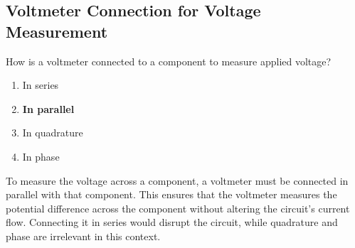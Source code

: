 \subsection{Voltmeter Connection for Voltage Measurement}
\label{T7D02}

\begin{tcolorbox}[colback=gray!10!white,colframe=black!75!black,title=T7D02]
How is a voltmeter connected to a component to measure applied voltage?
\begin{enumerate}[noitemsep]
    \item In series
    \item \textbf{In parallel}
    \item In quadrature
    \item In phase
\end{enumerate}
\end{tcolorbox}

To measure the voltage across a component, a voltmeter must be connected in parallel with that component. This ensures that the voltmeter measures the potential difference across the component without altering the circuit's current flow. Connecting it in series would disrupt the circuit, while quadrature and phase are irrelevant in this context.